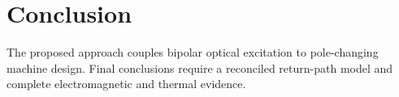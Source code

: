 \section{Conclusion}
The proposed approach couples bipolar optical excitation to pole-changing machine design. Final conclusions require a reconciled return-path model and complete electromagnetic and thermal evidence.

